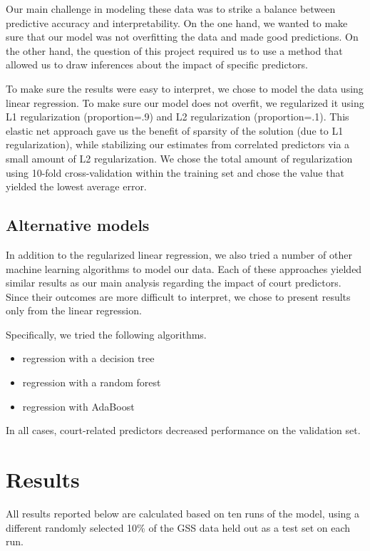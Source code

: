\documentclass{article}
\providecommand{\tightlist}{\setlength{\itemsep}{0pt}\setlength{\parskip}{0pt}}%
\begin{document}
Our main challenge in modeling these data was to strike a balance
between predictive accuracy and interpretability. On the one hand, we
wanted to make sure that our model was not overfitting the data and made
good predictions. On the other hand, the question of this project
required us to use a method that allowed us to draw inferences about the
impact of specific predictors.

To make sure the results were easy to interpret, we chose to model the
data using linear regression. To make sure our model does not overfit,
we regularized it using L1 regularization (proportion=.9) and L2
regularization (proportion=.1). This elastic net approach gave us the
benefit of sparsity of the solution (due to L1 regularization), while
stabilizing our estimates from correlated predictors via a small amount
of L2 regularization. We chose the total amount of regularization using
10-fold cross-validation within the training set and chose the value
that yielded the lowest average error.

\subsection{Alternative models}\label{alternative-models}

In addition to the regularized linear regression, we also tried a number
of other machine learning algorithms to model our data. Each of these
approaches yielded similar results as our main analysis regarding the
impact of court predictors. Since their outcomes are more difficult to
interpret, we chose to present results only from the linear regression.

Specifically, we tried the following algorithms.

\begin{itemize}
\tightlist
\item
  regression with a decision tree
\item
  regression with a random forest
\item
  regression with AdaBoost
\end{itemize}

In all cases, court-related predictors decreased performance on the
validation set.


\section{Results}\label{results}

All results reported below are calculated based on ten runs of the
model, using a different randomly selected 10\% of the GSS data held out
as a test set on each run.
\end{document}
